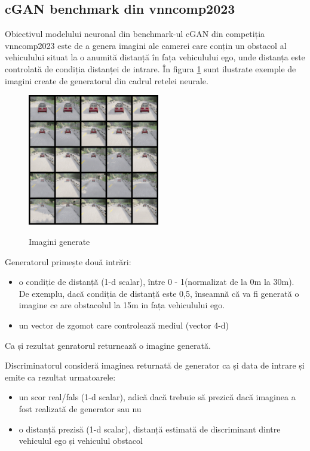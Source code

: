 \subsection*{cGAN benchmark din vnncomp2023}
Obiectivul \cite{vnncomp2023Chat} modelului neuronal din benchmark-ul cGAN din competiția vnncomp2023 este de a genera imagini ale camerei care conțin un obstacol al vehiculului situat la o anumită distanță în fața vehiculului ego, unde distanța este controlată de condiția distanței de intrare. În figura \ref{imaginiGenerate} sunt ilustrate exemple de imagini create de generatorul din cadrul retelei neurale.

\begin{figure}[ht]
\centering
{\includegraphics[width=5.75cm]{imagini/obstacle.png}}
\caption{Imagini generate}
\label{imaginiGenerate}
\end{figure}

Generatorul primește două intrări:
\begin{itemize}
\item o condiție de distanță (1-d scalar), între 0 - 1(normalizat de la 0m la 30m). De exemplu, dacă condiția de distanță este 0,5, înseamnă că va fi generată o imagine ce are obstacolul la 15m in fața vehiculului ego.
\item un vector de zgomot care controlează mediul (vector 4-d)
\end{itemize}

Ca și rezultat genratorul returnează o imagine generată.


Discriminatorul consideră imaginea returnată de generator ca și data de intrare și emite ca rezultat urmatoarele:
\begin{itemize}
\item un scor real/fals (1-d scalar), adică dacă trebuie să prezică dacă imaginea a fost realizată de generator sau nu
\item o distanță prezisă (1-d scalar), distanță estimată de discriminant dintre vehiculul ego și vehiculul obstacol
\end{itemize}

